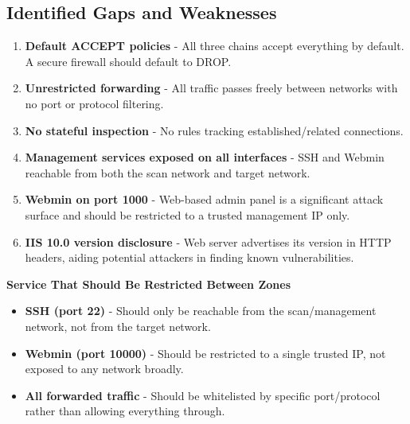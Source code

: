 \documentclass[12pt]{article}
\begin{document}
\subsection{Identified Gaps and Weaknesses}
\begin{enumerate}
	\item \textbf{Default ACCEPT policies} - All three chains accept everything by default. A secure firewall should default to DROP.
	\item \textbf{Unrestricted forwarding} - All traffic passes freely between networks with no port or protocol filtering.
	\item \textbf{No stateful inspection} - No rules tracking established/related connections.
	\item \textbf{Management services exposed on all interfaces} - SSH and Webmin reachable from both the scan network and target network.
	\item \textbf{Webmin on port 1000} - Web-based admin panel is a significant attack surface and should be restricted to a trusted management IP only.
	\item \textbf{IIS 10.0 version disclosure} - Web server advertises its version in HTTP headers, aiding potential attackers in finding known vulnerabilities.
\end{enumerate}
\textbf{Service That Should Be Restricted Between Zones}
\begin{itemize}
	\item \textbf{SSH (port 22)} - Should only be reachable from the scan/management network, not from the target network.
	\item \textbf{Webmin (port 10000)} - Should be restricted to a single trusted IP, not exposed to any network broadly.
	\item \textbf{All forwarded traffic} - Should be whitelisted by specific port/protocol rather than allowing everything through.
\end{itemize}
\end{document}

